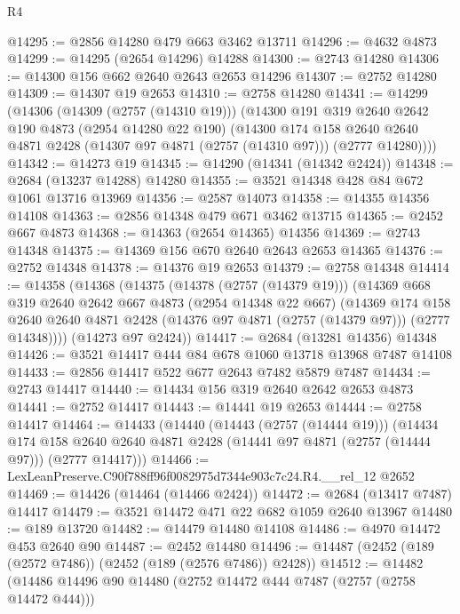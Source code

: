 \begin{lexlean}{R4}
\begin{coremodule}
@14295 := @2856 @14280 @479 @663 @3462 @13711
@14296 := @4632 @4873
@14299 := @14295 (@2654 @14296) @14288
@14300 := @2743 @14280
@14306 := @14300 @156 @662 @2640 @2643 @2653 @14296
@14307 := @2752 @14280
@14309 := @14307 @19 @2653
@14310 := @2758 @14280
@14341 := @14299
    (@14306
      (@14309 (@2757 (@14310 @19)))
      (@14300
        @191
        @319
        @2640
        @2642
        @190
        @4873
        (@2954 @14280 @22 @190)
        (@14300
          @174
          @158
          @2640
          @2640
          @4871
          @2428
          (@14307 @97 @4871 (@2757 (@14310 @97)))
          (@2777 @14280))))
@14342 := @14273 @19
@14345 := @14290 (@14341 (@14342 @2424))
@14348 := @2684 (@13237 @14288) @14280
@14355 := @3521 @14348 @428 @84 @672 @1061 @13716 @13969
@14356 := @2587 @14073
@14358 := @14355 @14356 @14108
@14363 := @2856 @14348 @479 @671 @3462 @13715
@14365 := @2452 @667 @4873
@14368 := @14363 (@2654 @14365) @14356
@14369 := @2743 @14348
@14375 := @14369 @156 @670 @2640 @2643 @2653 @14365
@14376 := @2752 @14348
@14378 := @14376 @19 @2653
@14379 := @2758 @14348
@14414 := @14358
    (@14368
      (@14375
        (@14378 (@2757 (@14379 @19)))
        (@14369
          @668
          @319
          @2640
          @2642
          @667
          @4873
          (@2954 @14348 @22 @667)
          (@14369
            @174
            @158
            @2640
            @2640
            @4871
            @2428
            (@14376 @97 @4871 (@2757 (@14379 @97)))
            (@2777 @14348))))
      (@14273 @97 @2424))
@14417 := @2684 (@13281 @14356) @14348
@14426 := @3521 @14417 @444 @84 @678 @1060 @13718 @13968 @7487 @14108
@14433 := @2856 @14417 @522 @677 @2643 @7482 @5879 @7487
@14434 := @2743 @14417
@14440 := @14434 @156 @319 @2640 @2642 @2653 @4873
@14441 := @2752 @14417
@14443 := @14441 @19 @2653
@14444 := @2758 @14417
@14464 := @14433
    (@14440
      (@14443 (@2757 (@14444 @19)))
      (@14434
        @174
        @158
        @2640
        @2640
        @4871
        @2428
        (@14441 @97 @4871 (@2757 (@14444 @97)))
        (@2777 @14417)))
@14466 := LexLeanPreserve.C90f788ff96f0082975d7344e903c7c24.R4.__rel_12 @2652
@14469 := @14426 (@14464 (@14466 @2424))
@14472 := @2684 (@13417 @7487) @14417
@14479 := @3521 @14472 @471 @22 @682 @1059 @2640 @13967
@14480 := @189 @13720
@14482 := @14479 @14480 @14108
@14486 := @4970 @14472 @453 @2640 @90
@14487 := @2452 @14480
@14496 := @14487 (@2452 (@189 (@2572 @7486)) (@2452 (@189 (@2576 @7486)) @2428))
@14512 := @14482
    (@14486
      @14496
      @90
      @14480
      (@2752 @14472 @444 @7487 (@2757 (@2758 @14472 @444)))

\end{coremodule}
\end{lexlean}
